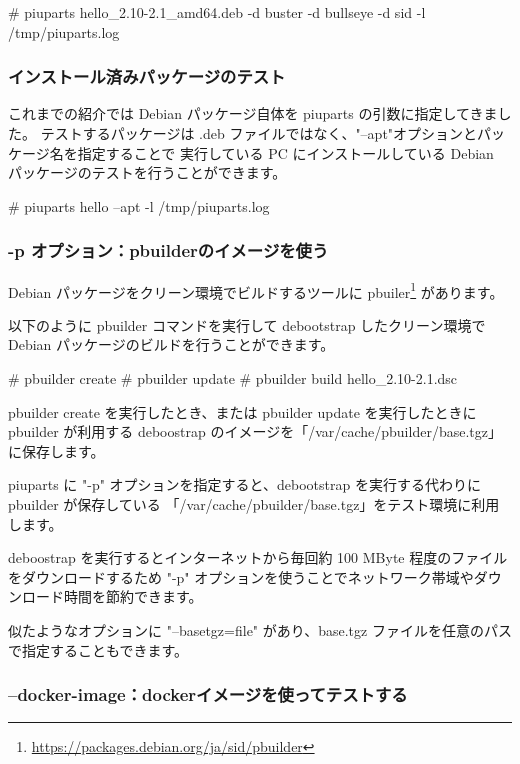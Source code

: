 \documentclass[mingoth,a4paper]{jsarticle}
\begin{document}
\begin{commandline}
# piuparts hello_2.10-2.1_amd64.deb -d buster -d bullseye -d sid -l /tmp/piuparts.log
\end{commandline}


\subsubsection{インストール済みパッケージのテスト}

これまでの紹介では Debian パッケージ自体を piuparts の引数に指定してきました。
テストするパッケージは .deb ファイルではなく、"--apt"オプションとパッケージ名を指定することで
実行している PC にインストールしている Debian パッケージのテストを行うことができます。

\begin{commandline}
# piuparts hello --apt -l /tmp/piuparts.log
\end{commandline}


\subsubsection{-p オプション：pbuilderのイメージを使う}

Debian パッケージをクリーン環境でビルドするツールに pbuiler\footnote{\url{https://packages.debian.org/ja/sid/pbuilder}} があります。

以下のように pbuilder コマンドを実行して debootstrap したクリーン環境で Debian パッケージのビルドを行うことができます。

\begin{commandline}
# pbuilder create
# pbuilder update
# pbuilder build hello_2.10-2.1.dsc
\end{commandline}

pbuilder create を実行したとき、または pbuilder update を実行したときに pbuilder が利用する
deboostrap のイメージを「/var/cache/pbuilder/base.tgz」に保存します。

piuparts に "-p" オプションを指定すると、debootstrap を実行する代わりに pbuilder が保存している
「/var/cache/pbuilder/base.tgz」をテスト環境に利用します。

deboostrap を実行するとインターネットから毎回約 100 MByte 程度のファイルをダウンロードするため
"-p" オプションを使うことでネットワーク帯域やダウンロード時間を節約できます。

似たようなオプションに "--basetgz=file" があり、base.tgz ファイルを任意のパスで指定することもできます。


\subsubsection{--docker-image：dockerイメージを使ってテストする}
\end{document}
